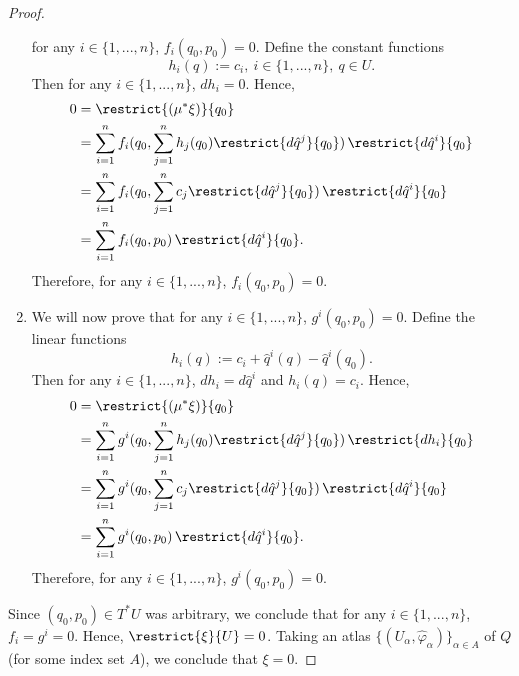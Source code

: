 \begin{proof}
\begin{enumerate}
      for any $i \in \{1, ..., n\}$, $f_i(q_0, p_0) = 0$.
      Define the constant functions
      \begin{equation}
        h_i(q) := c_i,\ i \in \{1, ..., n\},\ q \in U.
      \end{equation}
      Then for any $i \in \{1, ..., n\}$, $d h_i = 0$.
      Hence,
      \begin{equation}
        \begin{split}
          0
          & = \restrict{(\mu^* \xi)}{q_0} \\
          & = \sum_{i = 1}^n
              f_i(q_0, \sum_{j = 1}^n h_j(q_0) \restrict{d \hat{q}^j}{q_0})\,
              \restrict{d \hat{q}^i}{q_0} \\
          & = \sum_{i = 1}^n
              f_i(q_0, \sum_{j = 1}^n c_j \restrict{d \hat{q}^j}{q_0})\,
              \restrict{d \hat{q}^i}{q_0} \\
          & = \sum_{i = 1}^n f_i(q_0, p_0)\, \restrict{d \hat{q}^i}{q_0}.
        \end{split}
      \end{equation}
      Therefore, for any $i \in \{1, ..., n\}$, $f_i(q_0, p_0) = 0$.
    \item
      We will now prove that
      for any $i \in \{1, ..., n\}$, $g^i(q_0, p_0) = 0$.
      Define the linear functions
      \begin{equation}
        h_i(q) := c_i + \hat{q}^i(q) - \hat{q}^i(q_0).
      \end{equation}
      Then for any $i \in \{1, ..., n\}$,
      $d h_i = d \hat{q}^i$ and $h_i(q) = c_i$.
      Hence,
      \begin{equation}
        \begin{split}
          0
          & = \restrict{(\mu^* \xi)}{q_0} \\
          & = \sum_{i = 1}^n
              g^i(q_0, \sum_{j = 1}^n h_j(q_0) \restrict{d \hat{q}^j}{q_0})\,
              \restrict{d h_i}{q_0} \\
          & = \sum_{i = 1}^n
              g^i(q_0, \sum_{j = 1}^n c_j \restrict{d \hat{q}^j}{q_0})\,
              \restrict{d \hat{q}^i}{q_0} \\
          & = \sum_{i = 1}^n g^i(q_0, p_0)\, \restrict{d \hat{q}^i}{q_0}.
        \end{split}
      \end{equation}
      Therefore, for any $i \in \{1, ..., n\}$, $g^i(q_0, p_0) = 0$.
  \end{enumerate}
  Since $(q_0, p_0) \in T^* U$ was arbitrary, we conclude that
  for any $i \in \{1, ..., n\}$, $f_i = g^i = 0$.
  Hence, $\restrict{\xi}{U} = 0$.
  Taking an atlas $\{(U_\alpha, \hat{\varphi}_\alpha)\}_{\alpha \in A}$ of $Q$
  (for some index set $A$), we conclude that $\xi = 0$.
\end{proof}
